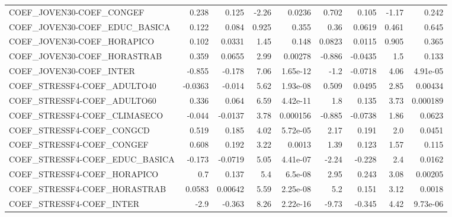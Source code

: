 \begin{tabular}{lrrrrrrrr}
COEF\_JOVEN30-COEF\_CONGEF              &       0.238 &        0.125 &    -2.26 &   0.0236 &      0.702 &       0.105 &        -1.17 &         0.242 \\
COEF\_JOVEN30-COEF\_EDUC\_BASICA         &       0.122 &        0.084 &    0.925 &    0.355 &       0.36 &      0.0619 &        0.461 &         0.645 \\
COEF\_JOVEN30-COEF\_HORAPICO            &       0.102 &       0.0331 &     1.45 &    0.148 &     0.0823 &      0.0115 &        0.905 &         0.365 \\
COEF\_JOVEN30-COEF\_HORASTRAB           &       0.359 &       0.0655 &     2.99 &  0.00278 &     -0.886 &     -0.0435 &          1.5 &         0.133 \\
COEF\_JOVEN30-COEF\_INTER               &      -0.855 &       -0.178 &     7.06 & 1.65e-12 &       -1.2 &     -0.0718 &         4.06 &      4.91e-05 \\
COEF\_STRESSF4-COEF\_ADULTO40           &     -0.0363 &       -0.014 &     5.62 & 1.93e-08 &      0.509 &      0.0495 &         2.85 &       0.00434 \\
COEF\_STRESSF4-COEF\_ADULTO60           &       0.336 &        0.064 &     6.59 & 4.42e-11 &        1.8 &       0.135 &         3.73 &      0.000189 \\
COEF\_STRESSF4-COEF\_CLIMASECO          &      -0.044 &      -0.0137 &     3.78 & 0.000156 &     -0.885 &     -0.0738 &         1.86 &        0.0623 \\
COEF\_STRESSF4-COEF\_CONGCD             &       0.519 &        0.185 &     4.02 & 5.72e-05 &       2.17 &       0.191 &          2.0 &        0.0451 \\
COEF\_STRESSF4-COEF\_CONGEF             &       0.608 &        0.192 &     3.22 &   0.0013 &       1.39 &       0.123 &         1.57 &         0.115 \\
COEF\_STRESSF4-COEF\_EDUC\_BASICA        &      -0.173 &      -0.0719 &     5.05 & 4.41e-07 &      -2.24 &      -0.228 &          2.4 &        0.0162 \\
COEF\_STRESSF4-COEF\_HORAPICO           &         0.7 &        0.137 &      5.4 &  6.5e-08 &       2.95 &       0.243 &         3.08 &       0.00205 \\
COEF\_STRESSF4-COEF\_HORASTRAB          &      0.0583 &      0.00642 &     5.59 & 2.25e-08 &        5.2 &       0.151 &         3.12 &        0.0018 \\
COEF\_STRESSF4-COEF\_INTER              &        -2.9 &       -0.363 &     8.26 & 2.22e-16 &      -9.73 &      -0.345 &         4.42 &      9.73e-06 \\

\end{tabular}
